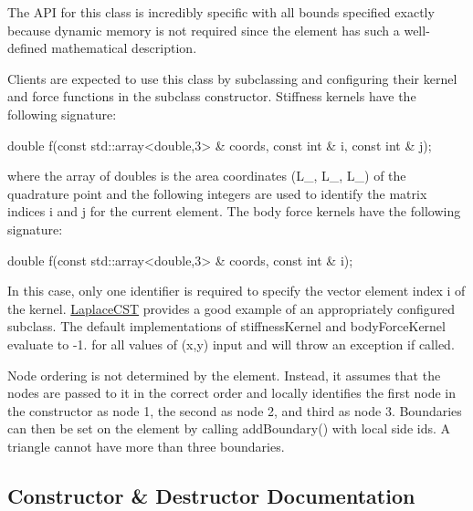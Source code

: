The A\+PI for this class is incredibly specific with all bounds specified exactly because dynamic memory is not required since the element has such a well-\/defined mathematical description.

Clients are expected to use this class by subclassing and configuring their kernel and force functions in the subclass\textquotesingle{} constructor. Stiffness kernels have the following signature\+: 
\begin{DoxyCode}
\textcolor{keywordtype}{double} f(\textcolor{keyword}{const} std::array<double,3> & coords, \textcolor{keyword}{const} \textcolor{keywordtype}{int} & i,
\textcolor{keyword}{const} \textcolor{keywordtype}{int} & j);
\end{DoxyCode}
 where the array of doubles is the area coordinates (L\+\_, L\+\_, L\+\_) of the quadrature point and the following integers are used to identify the matrix indices i and j for the current element. The body force kernels have the following signature\+: 
\begin{DoxyCode}
\textcolor{keywordtype}{double} f(\textcolor{keyword}{const} std::array<double,3> & coords, \textcolor{keyword}{const} \textcolor{keywordtype}{int} & i);
\end{DoxyCode}
 In this case, only one identifier is required to specify the vector element index i of the kernel. \hyperlink{a00809}{Laplace\+C\+ST} provides a good example of an appropriately configured subclass. The default implementations of stiffness\+Kernel and body\+Force\+Kernel evaluate to -\/1. for all values of (x,y) input and will throw an exception if called.

Node ordering is not determined by the element. Instead, it assumes that the nodes are passed to it in the correct order and locally identifies the first node in the constructor as node 1, the second as node 2, and third as node 3. Boundaries can then be set on the element by calling add\+Boundary() with local side ids. A triangle cannot have more than three boundaries. 

\subsection{Constructor \& Destructor Documentation}
\mbox{\label{a00789_aa54c09f1dd7cacaf1f4f0b1428859c00}} 
